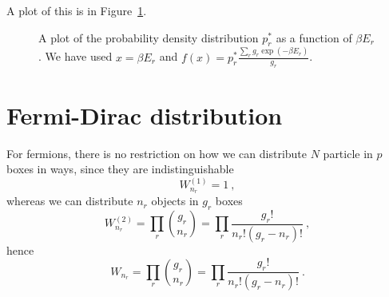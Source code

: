     A plot of this is in Figure~\ref{en:bol}.
    \begin{figure}
        \centering
        \caption{A plot of the probability density distribution $p_r^*$ as a function of $\beta E_r$. We have used $x = \beta E_r$ and $f(x) = p_r^* \frac{\sum_r g_r \exp(- \beta E_r)}{g_r}$.}
        \label{en:bol}
    \end{figure}

\section{Fermi-Dirac distribution}

    For fermions, there is no restriction on how we can distribute $N$ particle in $p$ boxes in ways, since they are indistinguishable
    \begin{equation*}
        W^{(1)}_{n_r} = 1 ~,
    \end{equation*}
    whereas we can distribute $n_r$ objects in $g_r$ boxes
    \begin{equation*}
        W^{(2)}_{n_r} = \prod_r \binom{g_r}{n_r} = \prod_r \frac{g_r!}{n_r! (g_r - n_r)!} ~,
    \end{equation*}
    hence 
    \begin{equation*}
        W_{n_r} = \prod_r \binom{g_r}{n_r} = \prod_r \frac{g_r!}{n_r! (g_r - n_r)!} ~.
    \end{equation*}
    

